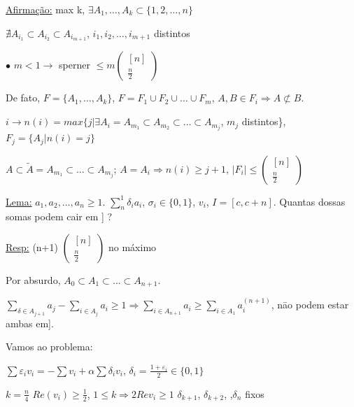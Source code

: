 \documentclass[a4paper,12pt]{article}
\renewcommand{\epsilon}{\ensuremath{\varepsilon}}
\theoremstyle{plain} %
\theoremstyle{definition} %
\theoremstyle{remark} %
\begin{document}
	
	\begin{framed}
		\underline{Afirma\c{c}\~ao:} max k, $\exists A_1,\dots,A_k\subset\{1,2,\dots,n\}$
		
		\hspace{5em} $\nexists A_{i_1}\subset A_{i_2}\subset A_{i_{m+1}}$, $i_1, i_2, \dots, i_{m+1}$ distintos
		
		$\bullet$ $m<1 \rightarrow$ sperner $\leqslant m \left(\begin{smallmatrix}
			[n]\\
			\frac{n}{2}
		\end{smallmatrix}\right)$
		
		De fato, $F=\{A_1,\dots,A_k\}$, $F=F_1\cup F_2\cup  \dotso \cup F_m$, $A,B \in F_i \Rightarrow A\not\subset B$.
		
		$i\rightarrow n(i) = max\{j|\exists A_i=A_{m_1}\subset A_{m_2}\subset  \dotso \subset A_{m_j}$, $m_j$ distintos\}, $F_j=\{A_j|n(i)=j\}$
		
		$A\subset \tilde A = A_{m_1}\subset \dotso\subset A_{m_j}$; $A=A_i \Rightarrow n(i)\geqslant j+1$, $|F_i|\leqslant \left(\begin{smallmatrix}
			[n]\\
			\frac{n}{2}
		\end{smallmatrix}\right)$
	\end{framed}
	
	\underline{Lema:} $a_1, a_2,  \dotso, a_n \geqslant 1$. $\sum\limits_n^1{\delta_i a_i}$, $\sigma_i\in \{0,1\}$, $v_i$, $I=[c, c+n]$. Quantas dossas somas podem cair em ] ? 
	
	\underline{Resp:} (n+1) $\left(\begin{smallmatrix}
		[n]\\
		\frac{n}{2}
	\end{smallmatrix}\right)$ no m\'aximo
	
	Por absurdo, $A_0 \subset A_1\subset \dotso\subset A_{n+1}$.
	
	$\sum\limits_{\delta\in A_{j+1}} a_j-\sum\limits_{i\in A_j} a_i \geqslant 1 \Rightarrow\sum\limits_{i\in A_{n+1}} a_i\geqslant \sum\limits_{i\in A_1} a_i^{(n+1)}$, n\=ao podem estar ambas em].
	
	Vamos ao problema:
	
	$\sum\epsilon_i v_i=-\sum v_i+\alpha\sum\delta_i v_i$, $\delta_i=\frac{1+\epsilon_i}{2}\in \{0,1\}$
	
	$k=\frac{n}{4}$ \hspace{2ex} $Re(v_i)\geqslant \frac{1}{2}$, $1\leqslant k \Rightarrow 2Re v_i \geqslant 1$ \hspace{2ex} $\delta_{k+1}$, $\delta_{k+2}$, \dotso,$\delta_{n}$ fixos
	
\end{document}
